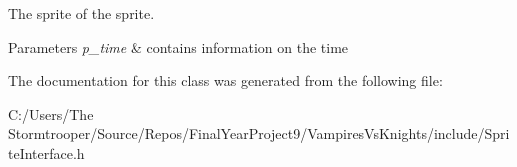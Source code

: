The sprite of the sprite. 


\begin{DoxyParams}{Parameters}
{\em p\+\_\+time} & contains information on the time \\
\hline
\end{DoxyParams}


The documentation for this class was generated from the following file\+:\begin{DoxyCompactItemize}
\item 
C\+:/\+Users/\+The Stormtrooper/\+Source/\+Repos/\+Final\+Year\+Project9/\+Vampires\+Vs\+Knights/include/Sprite\+Interface.\+h\end{DoxyCompactItemize}
